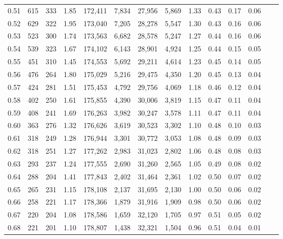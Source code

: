 \begin{tabular}{rrrrrrrrrrrrrr}
0.51 &    615 &  333 &    1.85 &  172,411 &    7,834 &  27,956 &   5,869 &  1.33 &  0.43 &  0.17 &      0.06 \\
0.52 &    629 &  322 &    1.95 &  173,040 &    7,205 &  28,278 &   5,547 &  1.30 &  0.43 &  0.16 &      0.06 \\
0.53 &    523 &  300 &    1.74 &  173,563 &    6,682 &  28,578 &   5,247 &  1.27 &  0.44 &  0.16 &      0.06 \\
0.54 &    539 &  323 &    1.67 &  174,102 &    6,143 &  28,901 &   4,924 &  1.25 &  0.44 &  0.15 &      0.05 \\
0.55 &    451 &  310 &    1.45 &  174,553 &    5,692 &  29,211 &   4,614 &  1.23 &  0.45 &  0.14 &      0.05 \\
0.56 &    476 &  264 &    1.80 &  175,029 &    5,216 &  29,475 &   4,350 &  1.20 &  0.45 &  0.13 &      0.04 \\
0.57 &    424 &  281 &    1.51 &  175,453 &    4,792 &  29,756 &   4,069 &  1.18 &  0.46 &  0.12 &      0.04 \\
0.58 &    402 &  250 &    1.61 &  175,855 &    4,390 &  30,006 &   3,819 &  1.15 &  0.47 &  0.11 &      0.04 \\
0.59 &    408 &  241 &    1.69 &  176,263 &    3,982 &  30,247 &   3,578 &  1.11 &  0.47 &  0.11 &      0.04 \\
0.60 &    363 &  276 &    1.32 &  176,626 &    3,619 &  30,523 &   3,302 &  1.10 &  0.48 &  0.10 &      0.03 \\
0.61 &    318 &  249 &    1.28 &  176,944 &    3,301 &  30,772 &   3,053 &  1.08 &  0.48 &  0.09 &      0.03 \\
0.62 &    318 &  251 &    1.27 &  177,262 &    2,983 &  31,023 &   2,802 &  1.06 &  0.48 &  0.08 &      0.03 \\
0.63 &    293 &  237 &    1.24 &  177,555 &    2,690 &  31,260 &   2,565 &  1.05 &  0.49 &  0.08 &      0.02 \\
0.64 &    288 &  204 &    1.41 &  177,843 &    2,402 &  31,464 &   2,361 &  1.02 &  0.50 &  0.07 &      0.02 \\
0.65 &    265 &  231 &    1.15 &  178,108 &    2,137 &  31,695 &   2,130 &  1.00 &  0.50 &  0.06 &      0.02 \\
0.66 &    258 &  221 &    1.17 &  178,366 &    1,879 &  31,916 &   1,909 &  0.98 &  0.50 &  0.06 &      0.02 \\
0.67 &    220 &  204 &    1.08 &  178,586 &    1,659 &  32,120 &   1,705 &  0.97 &  0.51 &  0.05 &      0.02 \\
0.68 &    221 &  201 &    1.10 &  178,807 &    1,438 &  32,321 &   1,504 &  0.96 &  0.51 &  0.04 &      0.01 \\

\end{tabular}
